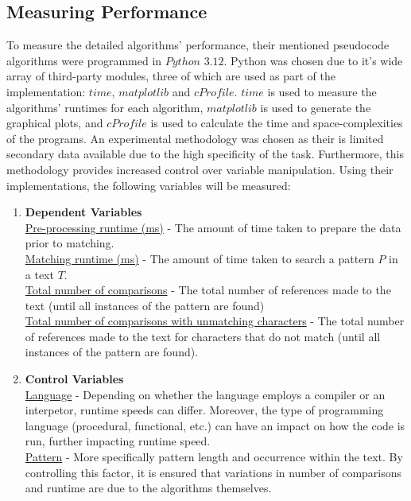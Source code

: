 \documentclass[12pt]{article}
\begin{document}
\subsection{Measuring Performance}

To measure the detailed algorithms' performance, their mentioned pseudocode algorithms were programmed in $Python$ $3.12$. 
Python was chosen due to it's wide array of third-party modules, three of which are used as part of the implementation: $time$, $matplotlib$ and $cProfile$. 
$time$ is used to measure the algorithms' runtimes for each algorithm, $matplotlib$ is used to generate the graphical plots, and $cProfile$ is used to calculate the time and space-complexities of the programs.
An experimental methodology was chosen as their is limited secondary data available due to the high specificity of the task. Furthermore, this methodology provides increased control over variable manipulation.
Using their implementations, the following variables will be measured:

\begin{enumerate}
	\item \textbf{Dependent Variables} \\
	\underline{Pre-processing runtime (ms)} - The amount of time taken to prepare the data prior to matching.\\
	\underline{Matching runtime (ms)} - The amount of time taken to search a pattern $P$ in a text $T$.\\
	\underline{Total number of comparisons} - The total number of references made to the text (until all instances of the pattern are found) \\
	\underline{Total number of comparisons with unmatching characters} - The total number of references made to the text for characters that do not match (until all instances of the pattern are found).
	\item \textbf{Control Variables} \\
	\underline{Language} - Depending on whether the language employs a compiler or an interpetor, runtime speeds can differ. Moreover, the type of programming language (procedural, functional, etc.) can have an impact on how the code is run, further impacting runtime speed.\\
	\underline{Pattern} - More specifically pattern length and occurrence within the text. By controlling this factor, it is ensured that variations in number of comparisons and runtime are due to the algorithms themselves. 
\end{enumerate}
\end{document}
